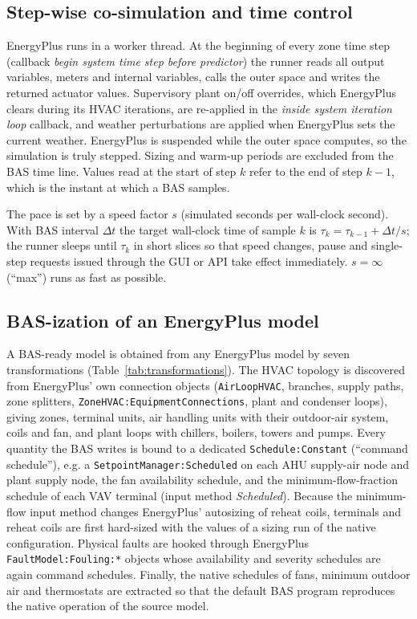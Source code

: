 \documentclass[preprint,12pt,authoryear=false]{elsarticle}
\begin{document}
\subsection{Step-wise co-simulation and time control}

EnergyPlus runs in a worker thread. At the beginning of every zone time step (callback \emph{begin system time step
before predictor}) the runner reads all output variables, meters and internal variables, calls the outer space and
writes the returned actuator values. Supervisory plant on/off overrides, which EnergyPlus clears during its HVAC
iterations, are re-applied in the \emph{inside system iteration loop} callback, and weather perturbations are applied
when EnergyPlus sets the current weather. EnergyPlus is suspended while the outer space computes, so the simulation is
truly stepped. Sizing and warm-up periods are excluded from the BAS time line. Values read at the start of step $k$
refer to the end of step $k-1$, which is the instant at which a BAS samples.

The pace is set by a speed factor $s$ (simulated seconds per wall-clock second). With BAS interval $\Delta t$ the
target wall-clock time of sample $k$ is $\tau_k = \tau_{k-1} + \Delta t / s$; the runner sleeps until $\tau_k$ in short
slices so that speed changes, pause and single-step requests issued through the GUI or API take effect immediately.
$s=\infty$ (``max'') runs as fast as possible.

\subsection{BAS-ization of an EnergyPlus model}
\label{sec:bas-ization}

A BAS-ready model is obtained from any EnergyPlus model by seven transformations (Table~\ref{tab:transformations}). The
HVAC topology is discovered from EnergyPlus' own connection objects (\texttt{AirLoopHVAC}, branches, supply paths,
zone splitters, \texttt{ZoneHVAC:EquipmentConnections}, plant and condenser loops), giving zones, terminal units, air
handling units with their outdoor-air system, coils and fan, and plant loops with chillers, boilers, towers and pumps.
Every quantity the BAS writes is bound to a dedicated \texttt{Schedule:Constant} (``command schedule''), e.g. a
\texttt{SetpointManager:Scheduled} on each AHU supply-air node and plant supply node, the fan availability schedule,
and the minimum-flow-fraction schedule of each VAV terminal (input method \emph{Scheduled}). Because the
minimum-flow input method changes EnergyPlus' autosizing of reheat coils, terminals and reheat coils are first
hard-sized with the values of a sizing run of the native configuration. Physical faults are hooked through EnergyPlus
\texttt{FaultModel:Fouling:*} objects whose availability and severity schedules are again command schedules. Finally,
the native schedules of fans, minimum outdoor air and thermostats are extracted so that the default BAS program
reproduces the native operation of the source model.
\end{document}
